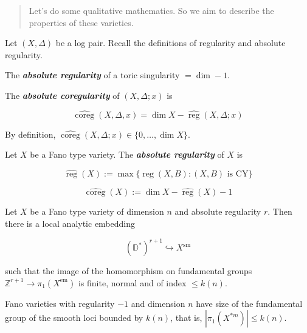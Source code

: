 \medskip{}

\begin{quotation}
Let's do some qualitative mathematics. So we
aim to describe the properties of these
varieties.
\end{quotation}

Let $(X,\Delta)$ be a log pair. Recall the
definitions of regularity and absolute
regularity.

\begin{remark}
\label{remark-moraga-6}
The \textit{\textbf{absolute regularity}} of
a toric singularity $= \dim -1$.
\end{remark}

\begin{definition}
\label{definition-moraga-12}
The \textit{\textbf{absolute coregularity}}
of  $(X,\Delta ;x)$ is

$$
\hat{\operatorname{coreg}}(X,\Delta,x)=\dim
X-\hat{\operatorname{reg}}(X,\Delta;x)
$$

\end{definition}

By definition,
$\hat{\operatorname{coreg}}(X,\Delta ;x)\in
\{0,\ldots,\dim X\} $.

\begin{definition}
\label{definition-moraga-13}
Let $X$ be a Fano type variety. The
\textit{\textbf{absolute regularity}} of $X$
is

$$
\hat{\operatorname{reg}}(X):=\max
\{\operatorname{reg}(X,B):(X,B)\text{ is CY}
\}
$$

$$
\hat{\operatorname{coreg}}(X):=\dim
X-\hat{\operatorname{reg}}(X)-1
$$

\end{definition}

\begin{theorem}[M,21]
\label{theorem-moraga-18}
Let $X$ be a Fano type variety of dimension
$n$ and absolute regularity $r$. Then there
is a local analytic embedding

$$
(\mathbb{D}^{*} )^{r+1} \hookrightarrow
X^{\operatorname{sm}}
$$

such that the image of the homomorphism on
fundamental groups $\mathbb{Z}^{r+1} \to
\pi_{1}(X^{\operatorname{em}}) $ is finite,
normal and of index $\leq k(n)$.
\end{theorem}

\begin{corollary}
\label{corollary-moraga-2}
Fano varieties with regularity $-1$ and
dimension $n$ have size of the fundamental
group of the smooth loci bounded by $k(n)$,
that is,  $|\pi_{1}(X^{*m}) |\leq k(n)$.
\end{corollary}

